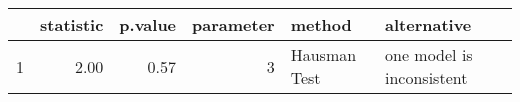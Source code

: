 \begin{table}[ht]
\centering
\begin{tabular}{rrrrll}
  \hline
 & statistic & p.value & parameter & method & alternative \\ 
  \hline
1 & 2.00 & 0.57 &   3 & Hausman Test & one model is inconsistent \\ 
   \hline
\end{tabular}
\end{table}
